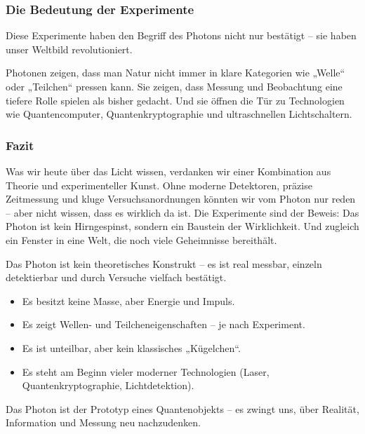 \subsubsection{Die Bedeutung der Experimente}
\label{box:experimente}
\begin{tcolorbox}[didaktikbox, title=Was uns die Experimente lehren]
	Diese Experimente haben den Begriff des Photons nicht nur bestätigt – sie haben unser Weltbild revolutioniert. 
	
	Photonen zeigen, dass man Natur nicht immer in klare Kategorien wie „Welle“ oder „Teilchen“ pressen kann. Sie zeigen, dass Messung und Beobachtung eine tiefere Rolle spielen als bisher gedacht. Und sie öffnen die Tür zu Technologien wie Quantencomputer, Quantenkryptographie und ultraschnellen Lichtschaltern.
\end{tcolorbox}
\newpage
\noindent
\subsubsection{Fazit}

Was wir heute über das Licht wissen, verdanken wir einer Kombination aus Theorie und experimenteller Kunst. Ohne moderne Detektoren, präzise Zeitmessung und kluge Versuchsanordnungen könnten wir vom Photon nur reden – aber nicht wissen, dass es wirklich da ist. Die Experimente sind der Beweis: Das Photon ist kein Hirngespinst, sondern ein Baustein der Wirklichkeit. Und zugleich ein Fenster in eine Welt, die noch viele Geheimnisse bereithält.

\vspace{1em}
\begin{tcolorbox}[didaktikbox, title=Was wir aus Kapitel I mitnehmen]
	\label{box:kapitel1faz}
	Das Photon ist kein theoretisches Konstrukt – es ist real messbar, einzeln detektierbar und durch Versuche vielfach bestätigt.
	
	\begin{itemize}
		\item Es besitzt keine Masse, aber Energie und Impuls.
		\item Es zeigt Wellen- und Teilcheneigenschaften – je nach Experiment.
		\item Es ist unteilbar, aber kein klassisches „Kügelchen“.
		\item Es steht am Beginn vieler moderner Technologien (Laser, Quantenkryptographie, Lichtdetektion).
	\end{itemize}
	
	Das Photon ist der Prototyp eines Quantenobjekts – es zwingt uns, über Realität, Information und Messung neu nachzudenken.
\end{tcolorbox}
\newpage
\noindent

